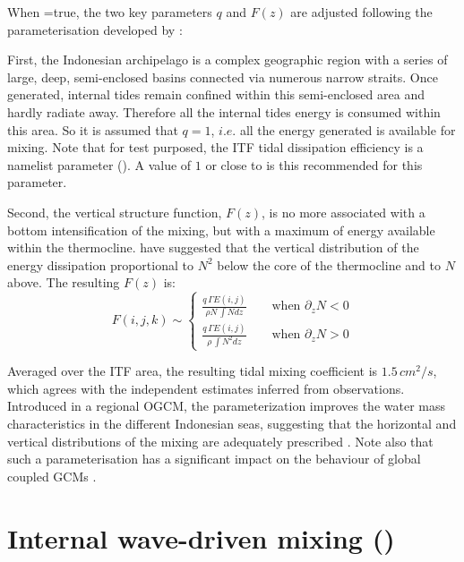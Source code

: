 \documentclass[NEMO_book]{subfiles}
\begin{document}
When =true, the two key parameters $q$ and $F(z)$ are adjusted following 
the parameterisation developed by \citet{Koch-Larrouy_al_GRL07}:

First, the Indonesian archipelago is a complex geographic region 
with a series of large, deep, semi-enclosed basins connected via 
numerous narrow straits. Once generated, internal tides remain 
confined within this semi-enclosed area and hardly radiate away. 
Therefore all the internal tides energy is consumed within this area. 
So it is assumed that $q = 1$, $i.e.$ all the energy generated is available for mixing.
Note that for test purposed, the ITF tidal dissipation efficiency is a 
namelist parameter (). A value of $1$ or close to is
this recommended for this parameter.

Second, the vertical structure function, $F(z)$, is no more associated
with a bottom intensification of the mixing, but with a maximum of 
energy available within the thermocline. \citet{Koch-Larrouy_al_GRL07} 
have suggested that the vertical distribution of the energy dissipation 
proportional to $N^2$ below the core of the thermocline and to $N$ above. 
The resulting $F(z)$ is:
\begin{equation} \label{Eq_Fz_itf}
F(i,j,k) \sim     \left\{ \begin{aligned}
\frac{q\,\Gamma E(i,j) } {\rho N \, \int N     dz}    \qquad \text{when $\partial_z N < 0$} \\
\frac{q\,\Gamma E(i,j) } {\rho     \, \int N^2 dz}    \qquad \text{when $\partial_z N > 0$}
                      \end{aligned} \right.
\end{equation}

Averaged over the ITF area, the resulting tidal mixing coefficient is $1.5\,cm^2/s$, 
which agrees with the independent estimates inferred from observations. 
Introduced in a regional OGCM, the parameterization improves the water mass 
characteristics in the different Indonesian seas, suggesting that the horizontal 
and vertical distributions of the mixing are adequately prescribed 
\citep{Koch-Larrouy_al_GRL07, Koch-Larrouy_al_OD08a, Koch-Larrouy_al_OD08b}.
Note also that such a parameterisation has a significant impact on the behaviour 
of global coupled GCMs \citep{Koch-Larrouy_al_CD10}.


\section{Internal wave-driven mixing ()}
\label{ZDF_tmx_new}
\end{document}
